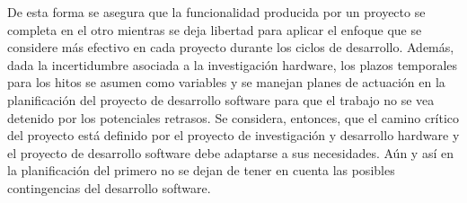 	De esta forma se asegura que la funcionalidad producida por un proyecto se completa en el otro mientras se deja libertad para aplicar el enfoque que se considere más efectivo en cada proyecto durante los ciclos de desarrollo. Además, dada la incertidumbre asociada a la investigación hardware, los plazos temporales para los hitos se asumen como variables y se manejan planes de actuación en la planificación del proyecto de desarrollo software para que el trabajo no se vea detenido por los potenciales retrasos. Se considera, entonces, que el camino crítico del proyecto está definido por el proyecto de investigación y desarrollo hardware y el proyecto de desarrollo software debe adaptarse a sus necesidades. Aún y así en la planificación del primero no se dejan de tener en cuenta las posibles contingencias del desarrollo software.\\

